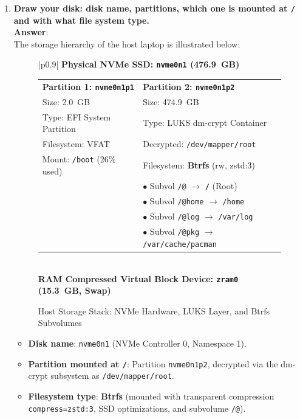\documentclass[12pt,a4paper]{article}
\begin{document}
\begin{enumerate}
    \item \textbf{Draw your disk: disk name, partitions, which one is mounted at \texttt{/} and with what file system type.} \\
    \textbf{Answer}: \\
    The storage hierarchy of the host laptop is illustrated below:

    \begin{figure}[H]
        \centering
        \begin{tabular}{|p{}|}
            \hline
            \textbf{Physical NVMe SSD: \texttt{nvme0n1} (476.9~GB)} \\
            \hline
            \begin{tabular}{p{}|p{}}
                \textbf{Partition 1: \texttt{nvme0n1p1}} & \textbf{Partition 2: \texttt{nvme0n1p2}} \\
                Size: 2.0~GB & Size: 474.9~GB \\
                Type: EFI System Partition & Type: LUKS dm-crypt Container \\
                Filesystem: VFAT & Decrypted: \texttt{/dev/mapper/root} \\
                Mount: \texttt{/boot} (26\% used) & Filesystem: \textbf{Btrfs} (rw, zstd:3) \\
                & $\bullet$ Subvol \texttt{/@} $\rightarrow$ \textbf{\texttt{/}} (Root) \\
                & $\bullet$ Subvol \texttt{/@home} $\rightarrow$ \texttt{/home} \\
                & $\bullet$ Subvol \texttt{/@log} $\rightarrow$ \texttt{/var/log} \\
                & $\bullet$ Subvol \texttt{/@pkg} $\rightarrow$ \texttt{/var/cache/pacman} \\
            \end{tabular} \\
            \hline
            \textbf{RAM Compressed Virtual Block Device: \texttt{zram0} (15.3~GB, Swap)} \\
            \hline
        \end{tabular}
        \caption{Host Storage Stack: NVMe Hardware, LUKS Layer, and Btrfs Subvolumes}
        \label{fig:storage_stack}
    \end{figure}

    \begin{itemize}
        \item \textbf{Disk name}: \texttt{nvme0n1} (NVMe Controller 0, Namespace 1).
        \item \textbf{Partition mounted at \texttt{/}}: Partition \texttt{nvme0n1p2}, decrypted via the dm-crypt subsystem as \texttt{/dev/mapper/root}.
        \item \textbf{Filesystem type}: \textbf{Btrfs} (mounted with transparent compression \texttt{compress=zstd:3}, SSD optimizations, and subvolume \texttt{/@}).
    \end{itemize}


\end{enumerate}
\end{document}
